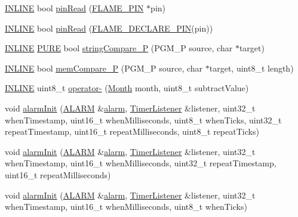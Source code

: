 \begin{DoxyCompactItemize}
\item 
\hyperlink{io_8h_a2eb6f9e0395b47b8d5e3eeae4fe0c116}{I\-N\-L\-I\-N\-E} bool \hyperlink{namespaceflame_a5af0380015625fb30e781edc0a3375c5}{pin\-Read} (\hyperlink{namespaceflame_ae345f4de995f89125721dd4f5cd4cd9f}{F\-L\-A\-M\-E\-\_\-\-P\-I\-N} $\ast$pin)
\item 
\hyperlink{io_8h_a2eb6f9e0395b47b8d5e3eeae4fe0c116}{I\-N\-L\-I\-N\-E} bool \hyperlink{namespaceflame_a862acf2526c6f22327e8a04431d4effd}{pin\-Read} (\hyperlink{io_8h_ab54f3ca5cc36256b922289e8e92316a3}{F\-L\-A\-M\-E\-\_\-\-D\-E\-C\-L\-A\-R\-E\-\_\-\-P\-I\-N}(pin))
\item 
\hyperlink{io_8h_a2eb6f9e0395b47b8d5e3eeae4fe0c116}{I\-N\-L\-I\-N\-E} \hyperlink{io_8h_acd42770aecb025cfac170d4d3ace4544}{P\-U\-R\-E} bool \hyperlink{namespaceflame_a8b18ca2b40c4664e4bb489daa33284e3}{string\-Compare\-\_\-\-P} (P\-G\-M\-\_\-\-P source, char $\ast$target)
\item 
\hyperlink{io_8h_a2eb6f9e0395b47b8d5e3eeae4fe0c116}{I\-N\-L\-I\-N\-E} bool \hyperlink{namespaceflame_a42203d2d3975412d8ffc56b1ce3bf604}{mem\-Compare\-\_\-\-P} (P\-G\-M\-\_\-\-P source, char $\ast$target, uint8\-\_\-t length)
\item 
\hyperlink{io_8h_a2eb6f9e0395b47b8d5e3eeae4fe0c116}{I\-N\-L\-I\-N\-E} uint8\-\_\-t \hyperlink{namespaceflame_a4a04a17e193625fab0c9e2a16ff80369}{operator-\/} (\hyperlink{namespaceflame_aa452b7c1018de4dfa5d302b613109649}{Month} month, uint8\-\_\-t subtract\-Value)
\item 
void \hyperlink{namespaceflame_ad0a4753055b7fb37368ac8364f271eb2}{alarm\-Init} (\hyperlink{namespaceflame_a7a5a7b0bdd1b44d7d0b0a600552b5ab5}{A\-L\-A\-R\-M} \&\hyperlink{structflame_1_1alarm}{alarm}, \hyperlink{classflame_1_1_timer_listener}{Timer\-Listener} \&listener, uint32\-\_\-t when\-Timestamp, uint16\-\_\-t when\-Milliseconds, uint8\-\_\-t when\-Ticks, uint32\-\_\-t repeat\-Timestamp, uint16\-\_\-t repeat\-Milliseconds, uint8\-\_\-t repeat\-Ticks)
\item 
void \hyperlink{namespaceflame_a930a3a6bf4004a92d4403f6b5fcd993f}{alarm\-Init} (\hyperlink{namespaceflame_a7a5a7b0bdd1b44d7d0b0a600552b5ab5}{A\-L\-A\-R\-M} \&\hyperlink{structflame_1_1alarm}{alarm}, \hyperlink{classflame_1_1_timer_listener}{Timer\-Listener} \&listener, uint32\-\_\-t when\-Timestamp, uint16\-\_\-t when\-Milliseconds, uint32\-\_\-t repeat\-Timestamp, uint16\-\_\-t repeat\-Milliseconds)
\item 
void \hyperlink{namespaceflame_abc5976713fbe36acaf27f7981f309dd3}{alarm\-Init} (\hyperlink{namespaceflame_a7a5a7b0bdd1b44d7d0b0a600552b5ab5}{A\-L\-A\-R\-M} \&\hyperlink{structflame_1_1alarm}{alarm}, \hyperlink{classflame_1_1_timer_listener}{Timer\-Listener} \&listener, uint32\-\_\-t when\-Timestamp, uint16\-\_\-t when\-Milliseconds, uint8\-\_\-t when\-Ticks)

\end{DoxyCompactItemize}
